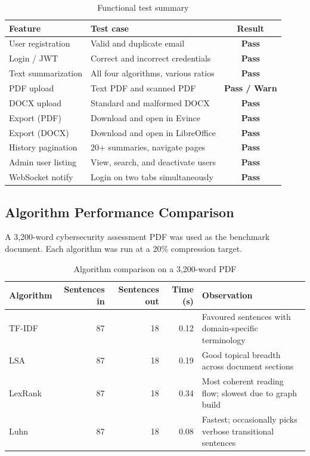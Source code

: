 \documentclass[12pt,a4paper]{article}
\begin{document}
\begin{table}[H]
  \centering
  \caption{Functional test summary}
  \begin{tabular}{@{}llc@{}}
    \toprule
    \textbf{Feature} & \textbf{Test case} & \textbf{Result} \\
    \midrule
    User registration    & Valid and duplicate email              & \textbf{Pass} \\
    Login / JWT          & Correct and incorrect credentials       & \textbf{Pass} \\
    Text summarization   & All four algorithms, various ratios     & \textbf{Pass} \\
    PDF upload           & Text PDF and scanned PDF                & \textbf{Pass / Warn} \\
    DOCX upload          & Standard and malformed DOCX             & \textbf{Pass} \\
    Export (PDF)         & Download and open in Evince             & \textbf{Pass} \\
    Export (DOCX)        & Download and open in LibreOffice        & \textbf{Pass} \\
    History pagination   & 20+ summaries, navigate pages           & \textbf{Pass} \\
    Admin user listing   & View, search, and deactivate users      & \textbf{Pass} \\
    WebSocket notify     & Login on two tabs simultaneously        & \textbf{Pass} \\
    \bottomrule
  \end{tabular}
\end{table}

\subsection{Algorithm Performance Comparison}

A 3,200-word cybersecurity assessment PDF was used as the benchmark document. Each algorithm was run at a 20\% compression target.

\begin{table}[H]
  \centering
  \caption{Algorithm comparison on a 3,200-word PDF}
  \begin{tabular}{@{}lrrrp{5cm}@{}}
    \toprule
    \textbf{Algorithm} & \textbf{Sentences in} & \textbf{Sentences out} & \textbf{Time (s)} & \textbf{Observation} \\
    \midrule
    TF-IDF  & 87 & 18 & 0.12 & Favoured sentences with domain-specific terminology \\
    LSA     & 87 & 18 & 0.19 & Good topical breadth across document sections \\
    LexRank & 87 & 18 & 0.34 & Most coherent reading flow; slowest due to graph build \\
    Luhn    & 87 & 18 & 0.08 & Fastest; occasionally picks verbose transitional sentences \\
    \bottomrule
  \end{tabular}
\end{table}
\end{document}
